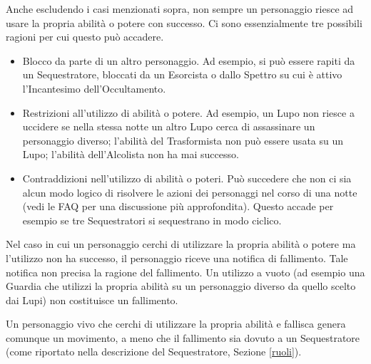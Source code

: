 \documentclass[a4paper,10pt]{article}
\begin{document}
Anche escludendo i casi menzionati sopra, non sempre un personaggio riesce ad usare la propria abilità o potere con successo. Ci sono essenzialmente tre possibili ragioni per cui questo può accadere.

\begin{itemize}
	\item Blocco da parte di un altro personaggio. Ad esempio, si può essere rapiti da un Sequestratore, bloccati da un Esorcista o dallo Spettro su cui è attivo l'Incantesimo dell'Occultamento.
	\item Restrizioni all'utilizzo di abilità o potere. Ad esempio, un Lupo non riesce a uccidere se nella stessa notte un altro Lupo cerca di assassinare un personaggio diverso; l'abilità del Trasformista non può essere usata su un Lupo; l'abilità dell'Alcolista non ha mai successo.
	\item Contraddizioni nell'utilizzo di abilità o poteri. Può succedere che non ci sia alcun modo logico di risolvere le azioni dei personaggi nel corso di una notte (vedi le FAQ per una discussione più approfondita). Questo accade per esempio se tre Sequestratori si sequestrano in modo ciclico.
\end{itemize}

Nel caso in cui un personaggio cerchi di utilizzare la propria abilità o potere ma l'utilizzo non ha successo, il personaggio riceve una notifica di fallimento. Tale notifica non precisa la ragione del fallimento. Un utilizzo a vuoto (ad esempio una Guardia che utilizzi la propria abilità su un personaggio diverso da quello scelto dai Lupi) non costituisce un fallimento.

Un personaggio vivo che cerchi di utilizzare la propria abilità e fallisca genera comunque un movimento, a meno che il fallimento sia dovuto a un Sequestratore (come riportato nella descrizione del Sequestratore, Sezione \ref{ruoli}).
\end{document}
